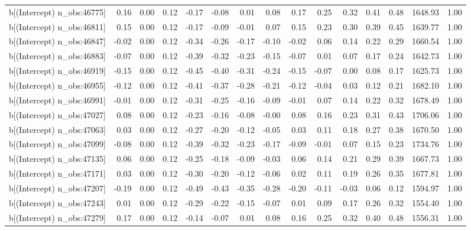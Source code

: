 \begin{table}[ht]
\begin{tabular}{rrrrrrrrrrrrrrr}
  b[(Intercept) n\_obs:46775] & 0.16 & 0.00 & 0.12 & -0.17 & -0.08 & 0.01 & 0.08 & 0.17 & 0.25 & 0.32 & 0.41 & 0.48 & 1648.93 & 1.00 \\ 
  b[(Intercept) n\_obs:46811] & 0.15 & 0.00 & 0.12 & -0.17 & -0.09 & -0.01 & 0.07 & 0.15 & 0.23 & 0.30 & 0.39 & 0.45 & 1639.77 & 1.00 \\ 
  b[(Intercept) n\_obs:46847] & -0.02 & 0.00 & 0.12 & -0.34 & -0.26 & -0.17 & -0.10 & -0.02 & 0.06 & 0.14 & 0.22 & 0.29 & 1660.54 & 1.00 \\ 
  b[(Intercept) n\_obs:46883] & -0.07 & 0.00 & 0.12 & -0.39 & -0.32 & -0.23 & -0.15 & -0.07 & 0.01 & 0.07 & 0.17 & 0.24 & 1642.73 & 1.00 \\ 
  b[(Intercept) n\_obs:46919] & -0.15 & 0.00 & 0.12 & -0.45 & -0.40 & -0.31 & -0.24 & -0.15 & -0.07 & 0.00 & 0.08 & 0.17 & 1625.73 & 1.00 \\ 
  b[(Intercept) n\_obs:46955] & -0.12 & 0.00 & 0.12 & -0.41 & -0.37 & -0.28 & -0.21 & -0.12 & -0.04 & 0.03 & 0.12 & 0.21 & 1682.10 & 1.00 \\ 
  b[(Intercept) n\_obs:46991] & -0.01 & 0.00 & 0.12 & -0.31 & -0.25 & -0.16 & -0.09 & -0.01 & 0.07 & 0.14 & 0.22 & 0.32 & 1678.49 & 1.00 \\ 
  b[(Intercept) n\_obs:47027] & 0.08 & 0.00 & 0.12 & -0.23 & -0.16 & -0.08 & -0.00 & 0.08 & 0.16 & 0.23 & 0.31 & 0.43 & 1706.06 & 1.00 \\ 
  b[(Intercept) n\_obs:47063] & 0.03 & 0.00 & 0.12 & -0.27 & -0.20 & -0.12 & -0.05 & 0.03 & 0.11 & 0.18 & 0.27 & 0.38 & 1670.50 & 1.00 \\ 
  b[(Intercept) n\_obs:47099] & -0.08 & 0.00 & 0.12 & -0.39 & -0.32 & -0.23 & -0.17 & -0.09 & -0.01 & 0.07 & 0.15 & 0.23 & 1734.76 & 1.00 \\ 
  b[(Intercept) n\_obs:47135] & 0.06 & 0.00 & 0.12 & -0.25 & -0.18 & -0.09 & -0.03 & 0.06 & 0.14 & 0.21 & 0.29 & 0.39 & 1667.73 & 1.00 \\ 
  b[(Intercept) n\_obs:47171] & 0.03 & 0.00 & 0.12 & -0.30 & -0.20 & -0.12 & -0.06 & 0.02 & 0.11 & 0.19 & 0.26 & 0.35 & 1677.81 & 1.00 \\ 
  b[(Intercept) n\_obs:47207] & -0.19 & 0.00 & 0.12 & -0.49 & -0.43 & -0.35 & -0.28 & -0.20 & -0.11 & -0.03 & 0.06 & 0.12 & 1594.97 & 1.00 \\ 
  b[(Intercept) n\_obs:47243] & 0.01 & 0.00 & 0.12 & -0.29 & -0.22 & -0.15 & -0.07 & 0.01 & 0.09 & 0.17 & 0.26 & 0.32 & 1554.40 & 1.00 \\ 
  b[(Intercept) n\_obs:47279] & 0.17 & 0.00 & 0.12 & -0.14 & -0.07 & 0.01 & 0.08 & 0.16 & 0.25 & 0.32 & 0.40 & 0.48 & 1556.31 & 1.00 \\ 

\end{tabular}
\end{table}
